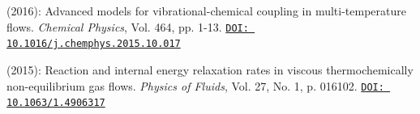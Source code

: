\begin{enumerate}
 (2016): Advanced models for vibrational-chemical coupling in multi-temperature flows. \textit{Chemical Physics}, Vol. 464, pp. 1-13.\newline
    \href{https://doi.org/10.1016/j.chemphys.2015.10.017}{\texttt{DOI: 10.1016/j.chemphys.2015.10.017}}

 (2015): Reaction and internal energy relaxation rates in viscous thermochemically non-equilibrium gas flows. \textit{Physics of Fluids}, Vol. 27, No. 1, p. 016102.\newline
    \href{https://doi.org/10.1063/1.4906317}{\texttt{DOI: 10.1063/1.4906317}}

\end{enumerate}
